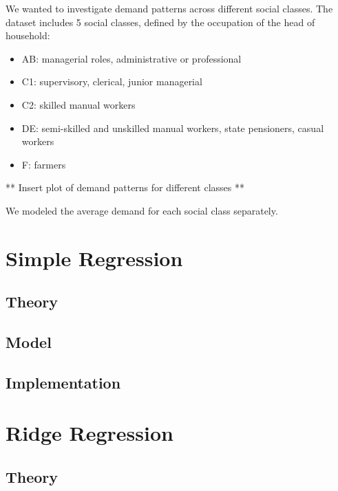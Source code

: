 \documentclass[
]{article}
\providecommand{\tightlist}{%
  \setlength{\itemsep}{0pt}\setlength{\parskip}{0pt}}
\begin{document}
We wanted to investigate demand patterns across different social
classes. The dataset includes 5 social classes, defined by the
occupation of the head of household:

\begin{itemize}
\tightlist
\item
  AB: managerial roles, administrative or professional
\item
  C1: supervisory, clerical, junior managerial
\item
  C2: skilled manual workers
\item
  DE: semi-skilled and unskilled manual workers, state pensioners,
  casual workers
\item
  F: farmers
\end{itemize}

** Insert plot of demand patterns for different classes **

We modeled the average demand for each social class separately.

\hypertarget{simple-regression}{%
\section{Simple Regression}\label{simple-regression}}

\hypertarget{theory}{%
\subsection{Theory}\label{theory}}

\hypertarget{model}{%
\subsection{Model}\label{model}}

\hypertarget{implementation}{%
\subsection{Implementation}\label{implementation}}

\hypertarget{ridge-regression}{%
\section{Ridge Regression}\label{ridge-regression}}

\hypertarget{theory-1}{%
\subsection{Theory}\label{theory-1}}
\end{document}
